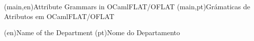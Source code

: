 
%




%
%
%
%
\nttitle(main,en){Attribute Grammars in OCamlFLAT/OFLAT}%
\nttitle(main,pt){Grámaticas de Atributos em OCamlFLAT/OFLAT}%






%
%
%
%
\ntdepartment*(en){Name of the Department} %
\ntdepartment*(pt){Nome do Departamento}   %



